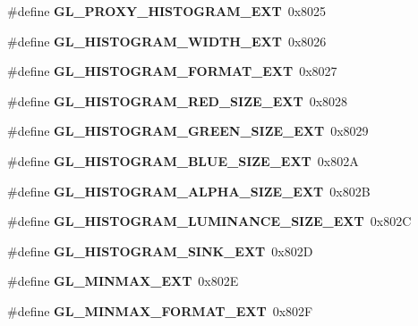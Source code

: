 \begin{DoxyCompactItemize}
\item 
\#define {\bfseries G\+L\+\_\+\+P\+R\+O\+X\+Y\+\_\+\+H\+I\+S\+T\+O\+G\+R\+A\+M\+\_\+\+E\+X\+T}~0x8025\label{_s_d_l__opengl_8h_aa00e4c2b8bf59bdbab7ac5fdc0befc98}

\item 
\#define {\bfseries G\+L\+\_\+\+H\+I\+S\+T\+O\+G\+R\+A\+M\+\_\+\+W\+I\+D\+T\+H\+\_\+\+E\+X\+T}~0x8026\label{_s_d_l__opengl_8h_a0b71930eda36bfa995c8e8a40961328f}

\item 
\#define {\bfseries G\+L\+\_\+\+H\+I\+S\+T\+O\+G\+R\+A\+M\+\_\+\+F\+O\+R\+M\+A\+T\+\_\+\+E\+X\+T}~0x8027\label{_s_d_l__opengl_8h_a50f06c060e84e5a756a8459493a9c507}

\item 
\#define {\bfseries G\+L\+\_\+\+H\+I\+S\+T\+O\+G\+R\+A\+M\+\_\+\+R\+E\+D\+\_\+\+S\+I\+Z\+E\+\_\+\+E\+X\+T}~0x8028\label{_s_d_l__opengl_8h_a93a562e74a135cc915d6c77ad9133818}

\item 
\#define {\bfseries G\+L\+\_\+\+H\+I\+S\+T\+O\+G\+R\+A\+M\+\_\+\+G\+R\+E\+E\+N\+\_\+\+S\+I\+Z\+E\+\_\+\+E\+X\+T}~0x8029\label{_s_d_l__opengl_8h_a7d3c95f5f5526bff5d8eb5993eda24f2}

\item 
\#define {\bfseries G\+L\+\_\+\+H\+I\+S\+T\+O\+G\+R\+A\+M\+\_\+\+B\+L\+U\+E\+\_\+\+S\+I\+Z\+E\+\_\+\+E\+X\+T}~0x802\+A\label{_s_d_l__opengl_8h_a9fec1556824092b376aac027447fa9c9}

\item 
\#define {\bfseries G\+L\+\_\+\+H\+I\+S\+T\+O\+G\+R\+A\+M\+\_\+\+A\+L\+P\+H\+A\+\_\+\+S\+I\+Z\+E\+\_\+\+E\+X\+T}~0x802\+B\label{_s_d_l__opengl_8h_a35c9b64a3db01e7cc4d63fa4250c4480}

\item 
\#define {\bfseries G\+L\+\_\+\+H\+I\+S\+T\+O\+G\+R\+A\+M\+\_\+\+L\+U\+M\+I\+N\+A\+N\+C\+E\+\_\+\+S\+I\+Z\+E\+\_\+\+E\+X\+T}~0x802\+C\label{_s_d_l__opengl_8h_aea3fe7d6edabbdb51fd17b4470a735f4}

\item 
\#define {\bfseries G\+L\+\_\+\+H\+I\+S\+T\+O\+G\+R\+A\+M\+\_\+\+S\+I\+N\+K\+\_\+\+E\+X\+T}~0x802\+D\label{_s_d_l__opengl_8h_a61d47d7210ccece9fa9bbac23d6405d0}

\item 
\#define {\bfseries G\+L\+\_\+\+M\+I\+N\+M\+A\+X\+\_\+\+E\+X\+T}~0x802\+E\label{_s_d_l__opengl_8h_a887374aba79ca68624e8859ed15c8d4c}

\item 
\#define {\bfseries G\+L\+\_\+\+M\+I\+N\+M\+A\+X\+\_\+\+F\+O\+R\+M\+A\+T\+\_\+\+E\+X\+T}~0x802\+F\label{_s_d_l__opengl_8h_acdfd1aafa4b5bf85ff483b5ea4767a74}


\end{DoxyCompactItemize}
